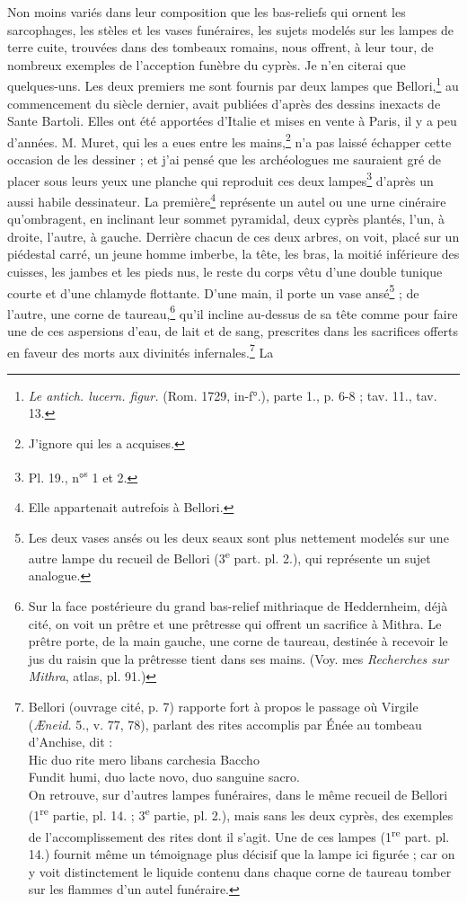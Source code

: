 \documentclass{article}
\begin{document}
Non moins variés dans leur composition que les bas-reliefs qui ornent les sarcophages, les stèles et les vases funéraires, les sujets modelés sur les lampes de terre cuite, trouvées dans des tombeaux romains, nous offrent, à leur tour, de nombreux exemples de l'acception funèbre du cyprès. Je n'en citerai que quelques-uns. Les deux premiers me sont fournis par deux lampes que Bellori,\footnote{\emph{Le antich. lucern. figur.} (Rom. 1729, in-f°.), parte 1., p. 6-8 ; tav. 11., tav. 13.} au commencement du siècle dernier, avait publiées d'après des dessins inexacts de Sante Bartoli. Elles ont été apportées d'Italie et mises en vente à Paris, il y a peu d'années. M. Muret, qui les a eues entre les mains,\footnote{J'ignore qui les a acquises.} n'a pas laissé échapper cette occasion de les dessiner ; et j'ai pensé que les archéologues me sauraient gré de placer sous leurs yeux une planche qui reproduit ces deux lampes\footnote{Pl. 19., n°\textsuperscript{s} 1 et 2.} d'après un aussi habile dessinateur. La première\footnote{Elle appartenait autrefois à Bellori.} représente un autel ou une urne cinéraire qu'ombragent, en inclinant leur sommet pyramidal, deux cyprès plantés, l'un, à droite, l'autre, à gauche. Derrière chacun de ces deux arbres, on voit, placé sur un piédestal carré, un jeune homme imberbe, la tête, les bras, la moitié inférieure des cuisses, les jambes et les pieds nus, le reste du corps vêtu d'une double tunique courte et d'une chlamyde flottante. D'une main, il porte un vase ansé\footnote{Les deux vases ansés ou les deux seaux sont plus nettement modelés sur une autre lampe du recueil de Bellori (3\textsuperscript{e} part. pl. 2.), qui représente un sujet analogue.} ; de l'autre, une corne de taureau,\footnote{Sur la face postérieure du grand bas-relief mithriaque de Heddernheim, déjà cité, on voit un prêtre et une prêtresse qui offrent un sacrifice à Mithra. Le prêtre porte, de la main gauche, une corne de taureau, destinée à recevoir le jus du raisin que la prêtresse tient dans ses mains. (Voy. mes \emph{Recherches sur Mithra}, atlas, pl. 91.)} qu'il incline au-dessus de sa tête comme pour faire une de ces aspersions d'eau, de lait et de sang, prescrites dans les sacrifices offerts en faveur des morts aux divinités infernales.\footnote{Bellori (ouvrage cité, p. 7) rapporte fort à propos le passage où Virgile (\emph{Æneid.} 5., v. 77, 78), parlant des rites accomplis par Énée au tombeau d'Anchise, dit :\\\hspace*{15mm}Hic duo rite mero libans carchesia Baccho\\\hspace*{15mm}Fundit humi, duo lacte novo, duo sanguine sacro.\\\hspace*{5mm}On retrouve, sur d'autres lampes funéraires, dans le même recueil de Bellori (1\textsuperscript{re} partie, pl. 14. ; 3\textsuperscript{e} partie, pl. 2.), mais sans les deux cyprès, des exemples de l'accomplissement des rites dont il s'agit. Une de ces lampes (1\textsuperscript{re} part. pl. 14.) fournit même un témoignage plus décisif que la lampe ici figurée ; car on y voit distinctement le liquide contenu dans chaque corne de taureau tomber sur les flammes d'un autel funéraire.} La 
\end{document}

